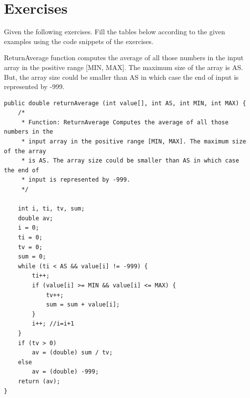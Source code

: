 \section{Exercises}
Given the following exercises. Fill the tables below according to the given examples using the code snippets of the exercises.

\begin{exercise}
    ReturnAverage function computes the average of all those numbers in the input array in the positive range [MIN, MAX]. The maximum size of the array is AS. But, the array size could be smaller than AS in which case the end of input is represented by -999.
    
    \begin{lstlisting}[caption={A program to calculate a ranged average in a list.}]
public double returnAverage (int value[], int AS, int MIN, int MAX) {
    /*
     * Function: ReturnAverage Computes the average of all those numbers in the
     * input array in the positive range [MIN, MAX]. The maximum size of the array
     * is AS. The array size could be smaller than AS in which case the end of
     * input is represented by -999.
     */

    int i, ti, tv, sum;
    double av;
    i = 0;
    ti = 0;
    tv = 0;
    sum = 0;
    while (ti < AS && value[i] != -999) {
        ti++;
        if (value[i] >= MIN && value[i] <= MAX) {
            tv++;
            sum = sum + value[i];
        }
        i++; //i=i+1
    }
    if (tv > 0)
        av = (double) sum / tv;
    else
        av = (double) -999;
    return (av);
}
    \end{lstlisting}
    

\end{exercise}
